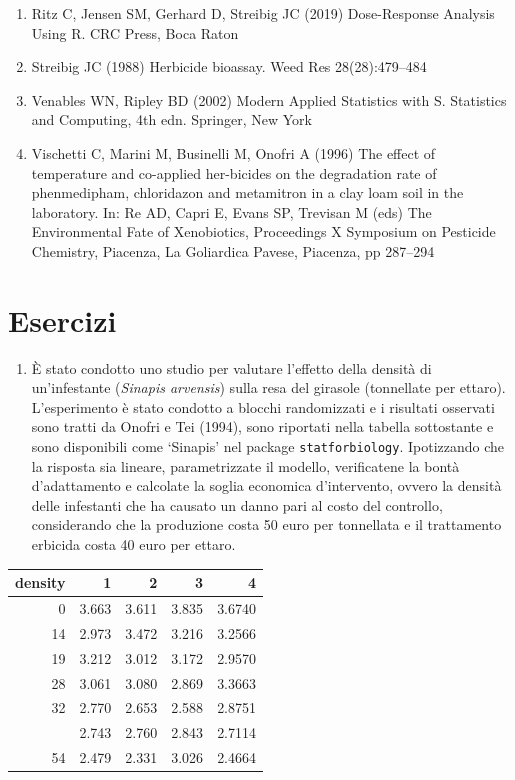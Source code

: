 \documentclass[
  12pt,
]{book}
\providecommand{\tightlist}{%
  \setlength{\itemsep}{0pt}\setlength{\parskip}{0pt}}
\begin{document}
\begin{enumerate}
\item
  Ritz C, Jensen SM, Gerhard D, Streibig JC (2019) Dose-Response Analysis Using R. CRC Press, Boca Raton
\item
  Streibig JC (1988) Herbicide bioassay. Weed Res 28(28):479--484
\item
  Venables WN, Ripley BD (2002) Modern Applied Statistics with S. Statistics and Computing, 4th edn. Springer, New York
\item
  Vischetti C, Marini M, Businelli M, Onofri A (1996) The effect of temperature and co-applied her-bicides on the degradation rate of phenmedipham, chloridazon and metamitron in a clay loam soil in the laboratory. In: Re AD, Capri E, Evans SP, Trevisan M (eds) The Environmental Fate of Xenobiotics, Proceedings X Symposium on Pesticide Chemistry, Piacenza, La Goliardica Pavese, Piacenza, pp 287--294
\end{enumerate}

\hypertarget{esercizi-4}{%
\section{Esercizi}\label{esercizi-4}}

\begin{enumerate}
\def\labelenumi{\arabic{enumi}.}
\tightlist
\item
  È stato condotto uno studio per valutare l'effetto della densità di un'infestante (\emph{Sinapis arvensis}) sulla resa del girasole (tonnellate per ettaro). L'esperimento è stato condotto a blocchi randomizzati e i risultati osservati sono tratti da Onofri e Tei (1994), sono riportati nella tabella sottostante e sono disponibili come `Sinapis' nel package \texttt{statforbiology}. Ipotizzando che la risposta sia lineare, parametrizzate il modello, verificatene la bontà d'adattamento e calcolate la soglia economica d'intervento, ovvero la densità delle infestanti che ha causato un danno pari al costo del controllo, considerando che la produzione costa 50 euro per tonnellata e il trattamento erbicida costa 40 euro per ettaro.
\end{enumerate}

\begin{center}
\vspace{12pt}

\begin{tabular}{rrrrr}
\toprule
density & 1 & 2 & 3 & 4\\
\midrule
0 & 3.663 & 3.611 & 3.835 & 3.6740\\
14 & 2.973 & 3.472 & 3.216 & 3.2566\\
19 & 3.212 & 3.012 & 3.172 & 2.9570\\
28 & 3.061 & 3.080 & 2.869 & 3.3663\\
32 & 2.770 & 2.653 & 2.588 & 2.8751\\
\addlinespace
38 & 2.743 & 2.760 & 2.843 & 2.7114\\
54 & 2.479 & 2.331 & 3.026 & 2.4664\\
\bottomrule
\end{tabular}
\end{center}
\end{document}
